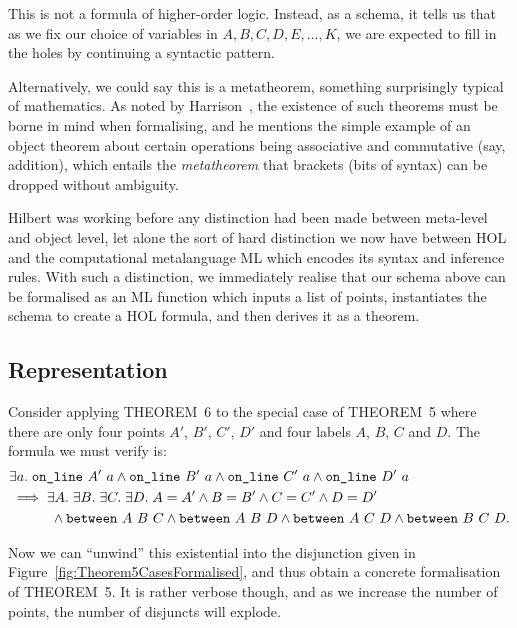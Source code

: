 This is not a formula of higher-order logic. Instead, as a schema, it tells us that as we fix our choice of variables in $A, B, C, D, E, \ldots, K$, we are expected to fill in the holes by continuing a syntactic pattern.

Alternatively, we could say this is a metatheorem, something surprisingly typical of mathematics. As noted by Harrison~\cite{FormalizedMathematics}, the existence of such theorems must be borne in mind when formalising, and he mentions the simple example of an object theorem about certain operations being associative and commutative (say, addition), which entails the \emph{metatheorem} that brackets (bits of syntax) can be dropped without ambiguity.

Hilbert was working before any distinction had been made between meta-level and object level, let alone the sort of hard distinction we now have between HOL and the computational metalanguage ML which encodes its syntax and inference rules. With such a distinction, we immediately realise that our schema above can be formalised as an ML function which inputs a list of points, instantiates the schema to create a HOL formula, and then derives it as a theorem.

\subsection{Representation}
Consider applying THEOREM~6 to the special case of THEOREM~5 where there are only four points $A'$, $B'$, $C'$, $D'$ and four labels $A$, $B$, $C$ and $D$. The formula we must verify is:
\begin{equation*}
  \begin{split}
    &\exists a.\;\code{on\_line}\ A'\ a\wedge\code{on\_line}\ B'\ a\wedge\code{on\_line}\ C'\ a\wedge\code{on\_line}\ D'\ a\\
    &\implies\exists A.\;\exists B.\;\exists C.\;\exists D.\; A = A' \wedge B = B' \wedge C = C' \wedge D = D'\\
    &\qquad\quad\wedge\between{A}{B}{C} \wedge \between{A}{B}{D}\wedge\between{A}{C}{D}\wedge\between{B}{C}{D}.
  \end{split}
\end{equation*} 

Now we can ``unwind'' this existential into the disjunction given in Figure~\ref{fig:Theorem5CasesFormalised}, and thus obtain a concrete formalisation of THEOREM~5. It is rather verbose though, and as we increase the number of points, the number of disjuncts will explode. 

